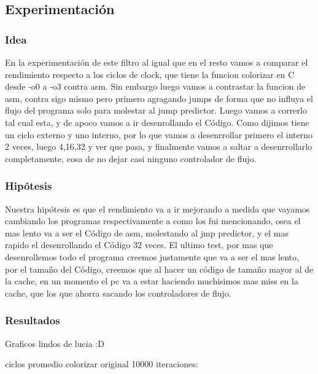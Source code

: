 	
\subsection{Experimentación}
\subsubsection{Idea}
	En la experimentación de este filtro al igual que en el resto vamos a comparar el rendimiento respecto a los ciclos de clock, que tiene la funcion colorizar en C desde -o0 a -o3 contra asm.
	 Sin embargo luego vamos a contrastar la funcion de asm, contra sigo mismo pero primero agragando jumps de forma que no influya el flujo del programa solo para molestar al jump predictor. Luego vamos a correrlo tal cual esta, y de apoco vamos a ir desenrollando el Código. Como dijimos tiene un ciclo externo y uno interno, por lo que vamos a desenrrollar primero el interno 2 veces, luego 4,16,32 y ver que pasa, y finalmente vamos a saltar a desenrrollarlo completamente, cosa de no dejar casi ninguno controlador de flujo.
	   
\subsubsection{Hipótesis}
	Nuestra hipótesis es que el rendimiento va a ir mejorando a medida que vayamos cambiando los programas respectivamente a como los fui mencionando, osea el mas lento va a ser el Código de asm, molestando al jmp predictor, y el mas rapido el desenrollando el Código 32 veces. El ultimo test, por mas que desenrollemos todo el programa creemos justamente que va a ser el mas lento, por el tamaño del Código, creemos que al hacer un código de tamaño mayor al de la cache, en un momento el pc va a estar haciendo muchisimos mas miss en la cache, que los que ahorra sacando los controladores de flujo.
	
	
\subsubsection{Resultados}
	Graficos lindos de lucia :D
	
	ciclos promedio colorizar original 10000 iteraciones:  	
	
	
